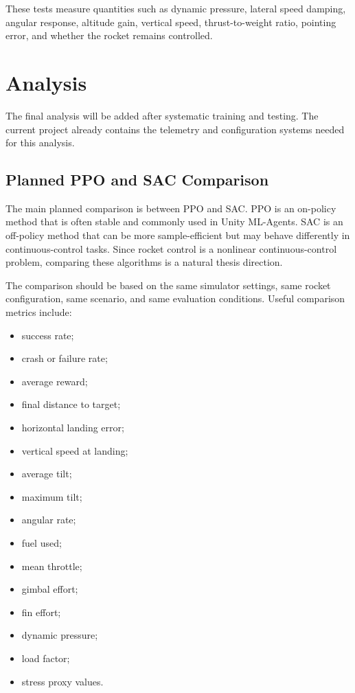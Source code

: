 \documentclass{article}
\begin{document}
These tests measure quantities such as dynamic pressure, lateral speed damping, angular response, altitude gain, vertical speed, thrust-to-weight ratio, pointing error, and whether the rocket remains controlled.

\section{Analysis}

The final analysis will be added after systematic training and testing. The current project already contains the telemetry and configuration systems needed for this analysis.

\subsection{Planned PPO and SAC Comparison}

The main planned comparison is between PPO and SAC. PPO is an on-policy method that is often stable and commonly used in Unity ML-Agents. SAC is an off-policy method that can be more sample-efficient but may behave differently in continuous-control tasks. Since rocket control is a nonlinear continuous-control problem, comparing these algorithms is a natural thesis direction.

The comparison should be based on the same simulator settings, same rocket configuration, same scenario, and same evaluation conditions. Useful comparison metrics include:

\begin{itemize}
    \item success rate;
    \item crash or failure rate;
    \item average reward;
    \item final distance to target;
    \item horizontal landing error;
    \item vertical speed at landing;
    \item average tilt;
    \item maximum tilt;
    \item angular rate;
    \item fuel used;
    \item mean throttle;
    \item gimbal effort;
    \item fin effort;
    \item dynamic pressure;
    \item load factor;
    \item stress proxy values.
\end{itemize}
\end{document}
